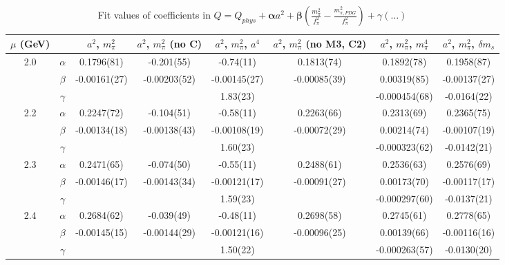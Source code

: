 \documentclass[12pt]{extarticle}
\begin{document}
\begin{table}[h!]
\begin{center}
\begin{tabular}{|c c|c|c|c|c|c|c|}
\hline
$\mu$ (GeV) &  & $a^2$, $m_\pi^2$& $a^2$, $m_\pi^2$ (no C)& $a^2$, $m_\pi^2$, $a^4$& $a^2$, $m_\pi^2$ (no M3, C2)& $a^2$, $m_\pi^2$, $m_\pi^4$& $a^2$, $m_\pi^2$, $\delta m_s$\\
\hline
\multirow{3}{0.5in}{2.0} & $\alpha$ & 0.1796(81)& -0.201(55)& -0.74(11)& 0.1813(74)& 0.1892(78)& 0.1958(87)\\
 & $\beta$ & -0.00161(27)& -0.00203(52)& -0.00145(27)& -0.00085(39)& 0.00319(85)& -0.00137(27)\\
 & $\gamma$ &  &  & 1.83(23)&  & -0.000454(68)& -0.0164(22)\\
\hline
\multirow{3}{0.5in}{2.2} & $\alpha$ & 0.2247(72)& -0.104(51)& -0.58(11)& 0.2263(66)& 0.2313(69)& 0.2365(75)\\
 & $\beta$ & -0.00134(18)& -0.00138(43)& -0.00108(19)& -0.00072(29)& 0.00214(74)& -0.00107(19)\\
 & $\gamma$ &  &  & 1.60(23)&  & -0.000323(62)& -0.0142(21)\\
\hline
\multirow{3}{0.5in}{2.3} & $\alpha$ & 0.2471(65)& -0.074(50)& -0.55(11)& 0.2488(61)& 0.2536(63)& 0.2576(69)\\
 & $\beta$ & -0.00146(17)& -0.00143(34)& -0.00121(17)& -0.00091(27)& 0.00173(70)& -0.00117(17)\\
 & $\gamma$ &  &  & 1.59(23)&  & -0.000297(60)& -0.0137(21)\\
\hline
\multirow{3}{0.5in}{2.4} & $\alpha$ & 0.2684(62)& -0.039(49)& -0.48(11)& 0.2698(58)& 0.2745(61)& 0.2778(65)\\
 & $\beta$ & -0.00145(15)& -0.00144(29)& -0.00121(16)& -0.00096(25)& 0.00139(66)& -0.00116(16)\\
 & $\gamma$ &  &  & 1.50(22)&  & -0.000263(57)& -0.0130(20)\\
\hline
\end{tabular}
\caption{Fit values of coefficients in $Q = Q_{phys} + \mathbf{\alpha} a^2 + \mathbf{\beta}\left(\frac{m_\pi^2}{f_\pi^2}-\frac{m_{\pi,PDG}^2}{f_\pi^2}\right) + \gamma(\ldots)$}
\end{center}
\end{table}





\end{document}
